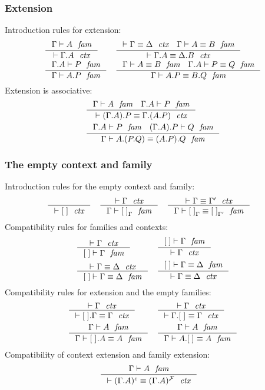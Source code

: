 \documentclass[handout]{beamer}
\begin{document}
\begin{frame}
\frametitle{Extension}
Introduction rules for extension:
\begin{align*}
& \inference
  { \jfam{\Gamma}{A}
    }
  { \jctx{\ctxext{\Gamma}{A}}
    }
& & \inference
    { \jctxeq{\Gamma}{\Delta}
      \jfameq{\Gamma}{A}{B}
      }
    { \jctxeq{\ctxext{\Gamma}{A}}{\ctxext{\Delta}{B}}
      }
    \\
& \inference
  { \jfam{{\Gamma}{A}}{P}
    }
  { \jfam{\Gamma}{\ctxext{A}{P}}
    }
& & \inference
    { \jfameq{\Gamma}{A}{B} 
      \jfameq{{\Gamma}{A}}{P}{Q}
      }
    { \jfameq{\Gamma}{\ctxext{A}{P}}{\ctxext{B}{Q}}
      }
\end{align*}
\pause
Extension is associative:
\begin{align*}
& \inference
  { \jfam{\Gamma}{A}
    \jfam{{\Gamma}{A}}{P}
    }
  { \jctxeq{\ctxext{{\Gamma}{A}}{P}}{\ctxext{\Gamma}{{A}{P}}}
    }
  \\
& \inference
  { \jfam{{\Gamma}{A}}{P}
    \jfam{{{\Gamma}{A}}{P}}{Q}
    }
  { \jfameq{\Gamma}{\ctxext{A}{{P}{Q}}}{\ctxext{{A}{P}}{Q}}
    }
\end{align*}
\end{frame}

\begin{frame}
\frametitle{The empty context and family}
\begin{small}
Introduction rules for the empty context and family:
\begin{align*}
& \inference
  { }
  { \jctx{\emptyc}
    }
& & \inference
  { \jctx{\Gamma}
    }
  { \jfam{\Gamma}{\emptyf[\Gamma]}
    }
& & \inference
  { \jctxeq{\Gamma}{\Gamma'}
    }
  { \jfameq{\Gamma}{\emptyf[\Gamma]}{\emptyf[\Gamma']}
    }
\end{align*}
\pause
Compatibility rules for families and contexts:
\begin{align*}
& \inference
  { \jctx{\Gamma}
    }
  { \jfam{\emptyc}{\Gamma}
    } 
& & \inference
    { \jfam{\emptyc}{\Gamma}
      }
    { \jctx{\Gamma}
      }
    \\
& \inference
  { \jctxeq{\Gamma}{\Delta}
    }
  { \jfameq{\emptyc}{\Gamma}{\Delta}
    }
& & \inference
    { \jfameq{\emptyc}{\Gamma}{\Delta}
      }
    { \jctxeq{\Gamma}{\Delta}
      }
\end{align*}
\pause
Compatibility rules for extension and the empty families:
\begin{align*}
& \inference
  { \jctx{\Gamma}
    }
  { \jctxeq{\ctxext{\emptyc}{\Gamma}}{\Gamma}
    }
& & \inference
  { \jctx{\Gamma}
    }
  { \jctxeq{\ctxext{\Gamma}{\emptyf}}{\Gamma}
    }
  \\
& \inference
  { \jfam{\Gamma}{A}
    }
  { \jfameq{\Gamma}{\ctxext{\emptyf}{A}}{A}
    }
& & \inference
  { \jfam{\Gamma}{A}
    }
  { \jfameq{\Gamma}{{A}{\emptyf}}{A}
    }
\end{align*}
Compatibility of context extension and family extension:
\begin{align*}
& \inference
  { \jfam{\Gamma}{A}
    }
  { \jctxeq{(\ctxext{\Gamma}{A})^c}{(\ctxext{\Gamma}{A})^\famsym}
    }
\end{align*}
\end{small}
\end{frame}
\end{document}
